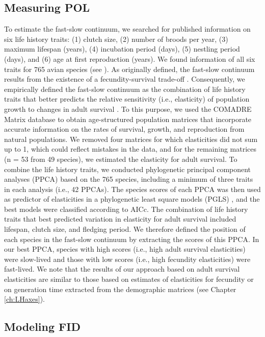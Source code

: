 \subsection*{Measuring POL}

To estimate the fast-slow continuum, we searched for published
information on six life history traits: (1) clutch size,
(2) number of broods per year, (3) maximum lifespan (years),
(4) incubation period (days), (5) nestling period (days), and
(6) age at first reproduction (years). We found information of
all six traits for 765 avian species (see \citet{Sol2016a}). As
originally defined, the fast-slow continuum results from the
existence of a fecundity-survival trade-off \citep{stearns1992evolution}.
Consequently, we empirically defined the fast-slow continuum
as the combination of life history traits that better predicts
the relative sensitivity (i.e., elasticity) of population growth to
changes in adult survival \citep{Caswell2000, Oli2003, Oli2004}. 
To this purpose, we used the COMADRE
Matrix database \citep{Salguero-Gomez2016} to obtain 
age-structured population matrices that incorporate accurate information
on the rates of survival, growth, and reproduction from
natural populations. We removed four matrices for which elasticities
did not sum up to 1, which could reflect mistakes in the
data, and for the remaining matrices (n = 53 from 49 species),
we estimated the elasticity for adult survival. To combine the
life history traits, we conducted phylogenetic principal
component analyses (PPCA) \citep{Revell2009a} based on the 765
species, including a minimum of three traits in each analysis
(i.e., 42 PPCAs). The species scores of each PPCA was then
used as predictor of elasticities in a phylogenetic least square
models (PGLS) \citep{Orme2013}, and the best models were
classified according to AICc. The combination of life history
traits that best predicted variation in elasticity for adult survival
included lifespan, clutch size, and fledging period. We
therefore defined the position of each species in the fast-slow
continuum by extracting the scores of this PPCA. In
our best PPCA, species with high scores (i.e., high adult survival
elasticities) were slow-lived and those with low scores
(i.e., high fecundity elasticities) were fast-lived. We note that
the results of our approach based on adult survival elasticities
are similar to those based on estimates of elasticities for fecundity
or on generation time extracted from the demographic
matrices (see Chapter \ref{ch:LHaxes}).


\subsection*{Modeling FID}

